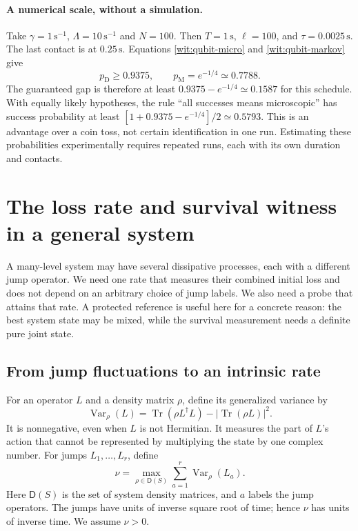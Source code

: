 \documentclass[11pt,a4paper]{article}
\numberwithin{equation}{section}
\theoremstyle{remark}
\DeclareMathOperator{\Tr}{Tr}
\DeclareMathOperator{\Var}{Var}
\begin{document}
\paragraph{A numerical scale, without a simulation.}
Take $\gamma=1\,\mathrm{s}^{-1}$, $\Lambda=10\,\mathrm{s}^{-1}$ and
$N=100$. Then $T=1\,\mathrm{s}$, $\ell=100$, and
$\tau=0.0025\,\mathrm{s}$. The last contact is at
$0.25\,\mathrm{s}$. Equations \eqref{wit:qubit-micro} and
\eqref{wit:qubit-markov} give
\begin{equation}
 p_{\mathrm D}\geq0.9375,\qquad
 p_{\mathrm M}=e^{-1/4}\simeq0.7788.
\end{equation}
The guaranteed gap is therefore at least
$0.9375-e^{-1/4}\simeq0.1587$ for this schedule.
With equally likely hypotheses, the rule ``all successes means
microscopic'' has success probability at least
$[1+0.9375-e^{-1/4}]/2\simeq0.5793$. This is an advantage over a coin toss, not
certain identification in one run. Estimating these probabilities
experimentally requires repeated runs, each with its own duration and
contacts.

\section{The loss rate and survival witness in a general system}
\label{wit:general}

A many-level system may have several dissipative processes, each with a
different jump operator. We need one rate that measures their combined
initial loss and does not depend on an arbitrary choice of jump labels.
We also need a probe that attains that rate. A protected reference is
useful here for a concrete reason: the best system state may be mixed,
while the survival measurement needs a definite pure joint state.

\subsection{From jump fluctuations to an intrinsic rate}

For an operator $L$ and a density matrix $\rho$, define its generalized
variance by
\begin{equation}
 \Var_\rho(L)=\Tr(\rho L^\dagger L)-|\Tr(\rho L)|^2.
\end{equation}
It is nonnegative, even when $L$ is not Hermitian. It measures the part
of $L$'s action that cannot be represented by multiplying the state by
one complex number. For jumps $L_1,\ldots,L_r$, define
\begin{equation}
 \nu=\max_{\rho\in\mathsf D(S)}\sum_{a=1}^{r}\Var_\rho(L_a).
 \label{wit:intrinsic-rate}
\end{equation}
Here $\mathsf D(S)$ is the set of system density matrices, and $a$
labels the jump operators. The jumps have units of inverse square root
of time; hence $\nu$ has units of inverse time. We assume $\nu>0$.
\end{document}
